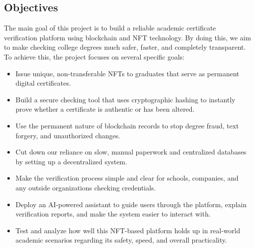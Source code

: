 \subsection{Objectives}

The main goal of this project is to build a reliable academic certificate verification platform using blockchain and NFT technology. By doing this, we aim to make checking college degrees much safer, faster, and completely transparent. To achieve this, the project focuses on several specific goals:
\begin{itemize}
    \item Issue unique, non-transferable NFTs to graduates that serve as permanent digital certificates.

    \item Build a secure checking tool that uses cryptographic hashing to instantly prove whether a certificate is authentic or has been altered.

    \item Use the permanent nature of blockchain records to stop degree fraud, text forgery, and unauthorized changes.

    \item Cut down our reliance on slow, manual paperwork and centralized databases by setting up a decentralized system.

    \item Make the verification process simple and clear for schools, companies, and any outside organizations checking credentials.

    \item Deploy an AI-powered assistant to guide users through the platform, explain verification reports, and make the system easier to interact with.

    \item Test and analyze how well this NFT-based platform holds up in real-world academic scenarios regarding its safety, speed, and overall practicality.
\end{itemize}